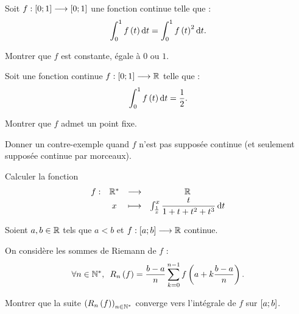 \begin{corr}
\end{corr}

\begin{exo}[Exercice 10]
Soit \(f:\left[0;1\right]\longrightarrow\left[0;1\right]\) une fonction continue telle que : \[\int_0^1f\paren{t}\odif{t}=\int_0^1f\paren{t}^2\odif{t}.\]

Montrer que \(f\) est constante, égale à \(0\) ou \(1\).
\end{exo}

\begin{corr}
\end{corr}

\begin{exo}[Exercice 11]
Soit une fonction continue \(f:\left[0;1\right]\longrightarrow\mathbb{R}\) telle que : \[\int_0^1f\paren{t}\odif{t}=\dfrac{1}{2}.\]

Montrer que \(f\) admet un point fixe.

Donner un contre-exemple quand \(f\) n'est pas supposée continue (et seulement supposée continue par morceaux).
\end{exo}

\begin{corr}
\end{corr}

\begin{exo}[Exercice 12]
Calculer la fonction \[\fonction{f}{\Rs}{\R}{x}{\int_{\frac{1}{x}}^x\dfrac{t}{1+t+t^2+t^3}\odif{t}}\]
\end{exo}

\begin{corr}
\end{corr}

\begin{exo}
Soient \(a,b\in\mathbb{R}\) tels que \(a<b\) et \(f:\left[a;b\right]\longrightarrow\mathbb{R}\) continue.

On considère les sommes de Riemann de \(f\) : \[\quantifs{\forall n\in\Ns}R_n\paren{f}=\dfrac{b-a}{n}\sum_{k=0}^{n-1}f\paren{a+k\dfrac{b-a}{n}}.\]

Montrer que la suite \(\left(R_n\left(f\right)\right)_{n\in\mathbb{N}^*}\) converge vers l'intégrale de \(f\) sur \(\left[a;b\right]\).
\end{exo}

\begin{corr}
\end{corr}

